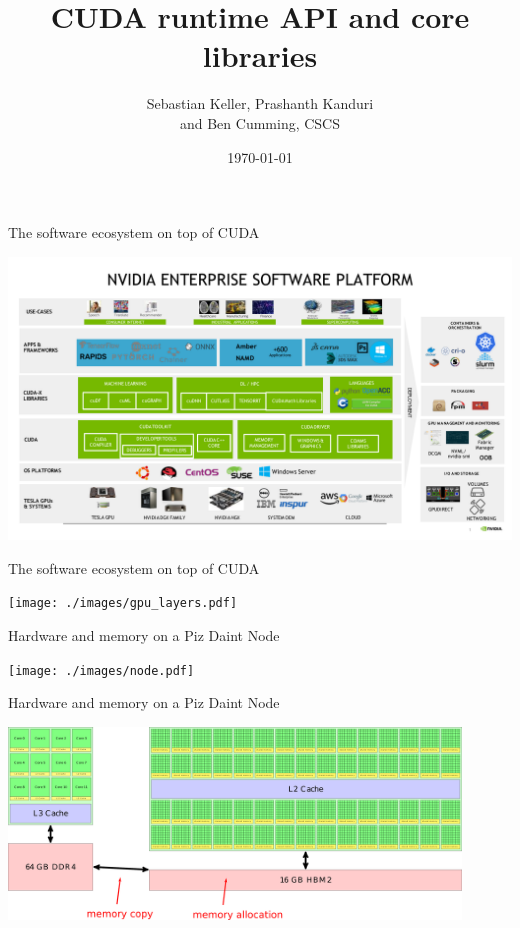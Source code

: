 \documentclass[aspectratio=43]{beamer}
\author{Sebastian Keller, Prashanth Kanduri\\ and Ben Cumming, CSCS}
\title{CUDA runtime API and core libraries}
\subtitle{}
\date{\today}
\begin{document}
\cscstitle

\begin{frame}[fragile]{The software ecosystem on top of CUDA}
    \begin{center}
        \includegraphics[width=\textwidth]{./images/gpu_platform.pdf}
    \end{center}
\end{frame}

\begin{frame}[fragile]{The software ecosystem on top of CUDA}
    \begin{center}
        \texttt{[image: ./images/gpu\_layers.pdf]}
    \end{center}
\end{frame}

\begin{frame}[fragile]{Hardware and memory on a Piz Daint Node}
    \begin{center}
        \texttt{[image: ./images/node.pdf]}
    \end{center}
\end{frame}

\begin{frame}[fragile]{Hardware and memory on a Piz Daint Node}
    \begin{center}
        \includegraphics[width=0.9\textwidth]{./images/node_annotated.pdf}
    \end{center}
\end{frame}
\end{document}
